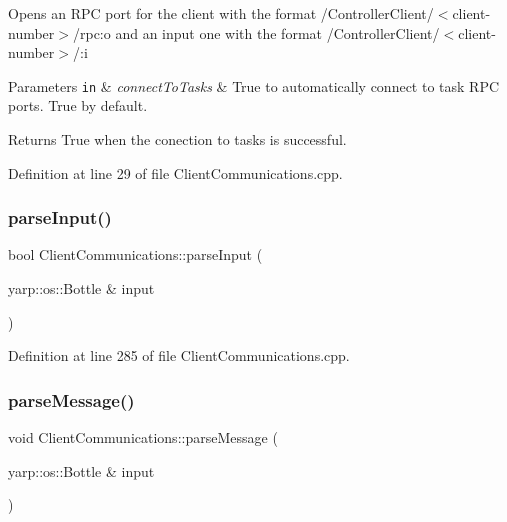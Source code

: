 Opens an R\+PC port for the client with the format /\+Controller\+Client/$<$client-\/number$>$/rpc\+:o and an input one with the format /\+Controller\+Client/$<$client-\/number$>$/\+:i 
\begin{DoxyParams}[1]{Parameters}
\mbox{\tt in}  & {\em connect\+To\+Tasks} & True to automatically connect to task R\+PC ports. True by default. \\
\hline
\end{DoxyParams}
\begin{DoxyReturn}{Returns}
True when the conection to tasks is successful. 
\end{DoxyReturn}


Definition at line 29 of file Client\+Communications.\+cpp.

\hypertarget{classocra__recipes_1_1ClientCommunications_ae1d3d48e76010741a8d6f3622191156c}{}\label{classocra__recipes_1_1ClientCommunications_ae1d3d48e76010741a8d6f3622191156c} 
\subsubsection{\texorpdfstring{parse\+Input()}{parseInput()}}
{\footnotesize\ttfamily bool Client\+Communications\+::parse\+Input (\begin{DoxyParamCaption}\item[{yarp\+::os\+::\+Bottle \&}]{input }\end{DoxyParamCaption})}



Definition at line 285 of file Client\+Communications.\+cpp.

\hypertarget{classocra__recipes_1_1ClientCommunications_a452774799b5d8448a8ffd3ab5d24aa22}{}\label{classocra__recipes_1_1ClientCommunications_a452774799b5d8448a8ffd3ab5d24aa22} 
\subsubsection{\texorpdfstring{parse\+Message()}{parseMessage()}}
{\footnotesize\ttfamily void Client\+Communications\+::parse\+Message (\begin{DoxyParamCaption}\item[{yarp\+::os\+::\+Bottle \&}]{input }\end{DoxyParamCaption})}


